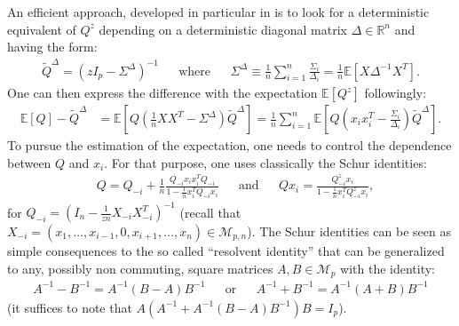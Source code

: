 \documentclass[ECP, preprint]{ejpecp} %
\begin{document}
An efficient approach, developed in particular in \cite{SIL86,SIL95} is to look for a deterministic equivalent of $Q^z$ depending on a deterministic diagonal matrix $\Delta \in \mathbb R^n$ and having the form:
\begin{align}\label{eq:definition_of_tilde_Q}
  \tilde Q^\Delta= \left(  zI_p - \Sigma^{\Delta} \right)^{-1}&
  &\text{where}&
  &\Sigma^{\Delta} \equiv  \frac{1}{n}\sum_{i=1}^n \frac{\Sigma_i}{\Delta_i} = \frac{1}{n} \mathbb E[X \Delta^{-1} X^T].
 \end{align}
 One can then express the difference with the expectation $\mathbb{E} \left[Q^z\right]$ followingly:
 \begin{align*}
  \mathbb{E} \left[Q\right] - \tilde Q^\Delta
  &=\mathbb{E}\left[Q\left(\frac{1}{n}XX^T - \Sigma^{\Delta}\right)\tilde{Q}^\Delta\right]
  =\frac{1}{n}\sum_{i=1}^n  \mathbb{E}\left[Q  \left(x_ix_i^T - \frac{\Sigma_i}{\Delta_i} \right)\tilde{Q}^\Delta\right].
\end{align*}
To pursue the estimation of the expectation, one needs to control the dependence between $Q$ and $x_i$. For that purpose, one uses classically the Schur identities:
\begin{align}\label{eq:lien_q_qj_schur}
  &Q=Q_{-i} +\frac{1}{n}\frac{Q_{-i}x_ix_i^TQ_{-i}}{1- \frac1{n}x_i^TQ_{-i}x_i}&
  &\text{and}&
  &Qx_i=\frac{Q^z_{-i}x_i}{1- \frac1{n}x_i^TQ^z_{-i}x_i},
\end{align}
for $Q_{-i} = (I_n - \frac{1}{zn} X_{-i}X_{-i}^T)^{-1}$ (recall that $X_{-i} = (x_1,\ldots, x_{i-1}, 0, x_{i+1}, \ldots, x_n) \in \mathcal M_{p,n}$). The Schur identities can be seen as simple consequences to the so called ``resolvent identity'' that can be generalized to any, possibly non commuting, square matrices $A,B \in \mathcal M_p$ with the identity:
\begin{align}\label{eq:resolvent_identity}
   A^{-1} - B^{-1} = A^{-1} (B-A) B^{-1}&
   &\text{or}&
   &A^{-1} + B^{-1} = A^{-1} (A+B) B^{-1}
 \end{align}
 (it suffices to note that $A(A^{-1} + A^{-1} (B-A) B^{-1})B = I_p$).
\end{document}
